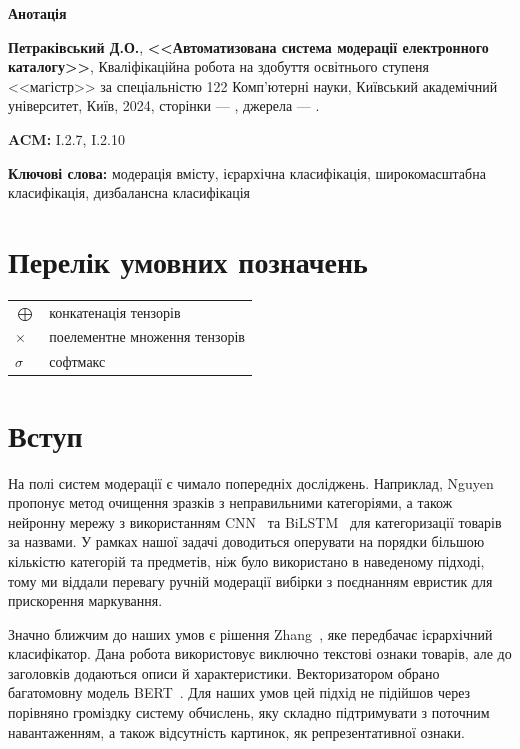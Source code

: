 \documentclass[fleqn,12pt,a4paper]{report}
\numberwithin{equation}{chapter}
\numberwithin{figure}{chapter}
\numberwithin{table}{chapter}
\numberwithin{footnote}{chapter}
\numberwithin{figure}{section}
\begin{document}
    \begin{center}
        \Large \textbf{Анотація}
    \end{center}
    \noindent
    \textbf{Петраківський Д.О.}, \textbf{<<Автоматизована система модерації електронного каталогу>>}, Кваліфікаційна
    робота на здобуття освітнього ступеня <<магістр>> за спеціальністю 122 Комп'ютерні науки, Київський академічний
    університет, Київ, 2024, сторінки --- \ztotpages, джерела --- .

    \bigskip
    \noindent
    \textbf{ACM:} I.2.7, I.2.10

    \bigskip
    \noindent
    \textbf{Ключові слова:} модерація вмісту, ієрархічна класифікація, широкомасштабна класифікація, дизбалансна
    класифікація

    \newpage
    \tableofcontents

    \newpage

    \chapter*{Перелік умовних позначень}\label{ch:conventions}

    \bigskip
    \begin{tabular}{ll}
        $\bigoplus$ & конкатенація тензорів         \\
        $\times$    & поелементне множення тензорів \\
        $\sigma$    & софтмакс
    \end{tabular}

    \newpage

    \chapter*{Вступ}\label{ch:introduction}

    На полі систем модерації є чимало попередніх досліджень.
    Наприклад, Nguyen~\cite{Nguyen2022} пропонує метод очищення зразків з неправильними категоріями, а також нейронну
    мережу з використанням CNN~\cite{Lecun1998} та BiLSTM~\cite{Schuster1997} для категоризації товарів за назвами.
    У рамках нашої задачі доводиться оперувати на порядки більшою кількістю категорій та предметів, ніж було
    використано в наведеному підході, тому ми віддали перевагу ручній модерації вибірки з поєднанням евристик для
    прискорення маркування.

    Значно ближчим до наших умов є рішення Zhang~\cite{Zhang2021}, яке передбачає ієрархічний класифікатор.
    Дана робота використовує виключно текстові ознаки товарів, але до заголовків додаються описи й характеристики.
    Векторизатором обрано багатомовну модель BERT~\cite{devlin-etal-2019-bert}.
    Для наших умов цей підхід не підійшов через порівняно громіздку систему обчислень, яку складно підтримувати з
    поточним навантаженням, а також відсутність картинок, як репрезентативної ознаки.
\end{document}
